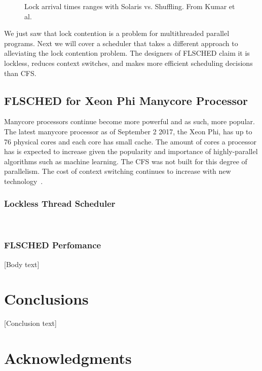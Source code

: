 \documentclass{sig-alternate}
\begin{document}
\begin{figure}
\centering
{}
\caption{Lock arrival times ranges with Solaris vs. Shuffling. From Kumar et al.~\cite{KumarEtal:2014}}
\label{fig:shuf_vs_solaris}
\end{figure}

We just saw that lock contention is a problem for multithreaded parallel programs. Next we will cover a scheduler that takes a different approach to alleviating the lock contention problem. The designers of FLSCHED claim it is lockless, reduces context switches, and makes more efficient scheduling decisions than CFS.~\cite{HeeseungEtal:2017}

\subsection{FLSCHED for Xeon Phi Manycore Processor}
\label{sec:flsched}

Manycore processors continue become more powerful and as such, more popular. The latest manycore processor as of September 2 2017, the Xeon Phi, has up to 76 physical cores and each core has small cache. The amount of cores a processor has is expected to increase given the popularity and importance of highly-parallel algorithms such as machine learning. The CFS was not built for this degree of parallelism. The cost of context switching continues to increase with new technology~\cite{HeeseungEtal:2017}.


\subsubsection{Lockless Thread Scheduler}
\label{sec:flsched_about}

\cite{Lozi:2016, HeeseungEtal:2017}
~\cite{KumarEtal:2014}

\subsubsection{FLSCHED Perfomance}
\label{sec:flsched_performance}

[Body text]

\section{Conclusions}
\label{sec:conclusions}

[Conclusion text]

\section*{Acknowledgments}
\label{sec:acknowledgments}



  
\end{document}
